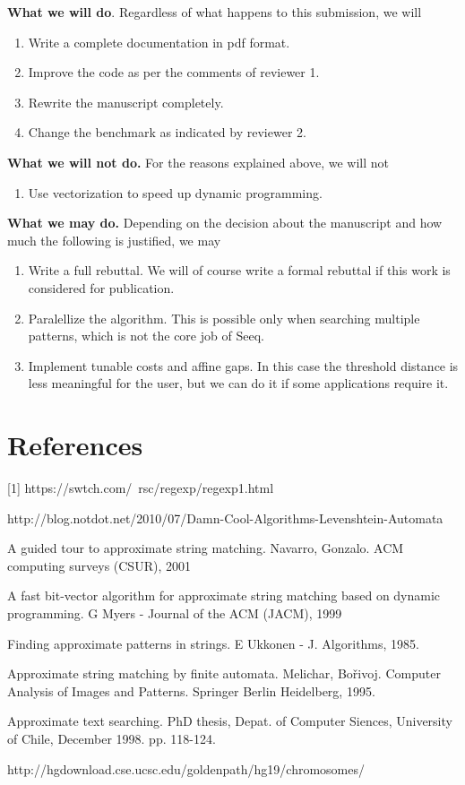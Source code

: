 \documentclass[12pt]{article}
\begin{document}
\vspace{.2in}

\noindent
\textbf{What we will do}.
\noindent
Regardless of what happens to this submission, we will
\begin{enumerate}
\item Write a complete documentation in pdf format.
\item Improve the code as per the comments of reviewer 1.
\item Rewrite the manuscript completely.
\item Change the benchmark as indicated by reviewer 2.
\end{enumerate}

\noindent
\textbf{What we will not do.}
\noindent
For the reasons explained above, we will not
\begin{enumerate}
\item Use vectorization to speed up dynamic programming.
\end{enumerate}

\noindent
\textbf{What we may do.}
\noindent
Depending on the decision about the manuscript and how
much the following is justified, we may
\begin{enumerate}
\item Write a full rebuttal. We will of course write a
formal rebuttal if this work is considered for
publication.
\item Paralellize the algorithm. This is possible only when
searching multiple patterns, which is not the core job of
Seeq.
\item Implement tunable costs and affine gaps. In this
case the threshold distance is less meaningful for the
user, but we can do it if some applications require it.
\end{enumerate}


\section{References}

[1] https://swtch.com/~rsc/regexp/regexp1.html
\par\noindent
[2] http://blog.notdot.net/2010/07/Damn-Cool-Algorithms-Levenshtein-Automata
\par\noindent
[3] A guided tour to approximate string matching. Navarro, Gonzalo.
ACM computing surveys (CSUR), 2001
\par\noindent
[4] A fast bit-vector algorithm for approximate string matching based
on dynamic programming. G Myers - Journal of the ACM (JACM), 1999
\par\noindent
[5] Finding approximate patterns in strings. E Ukkonen - J. Algorithms,
1985.
\par\noindent
[6] Approximate string matching by finite automata. Melichar, Bořivoj.
Computer Analysis of Images and Patterns. Springer Berlin Heidelberg, 1995.
\par\noindent
[7] Approximate text searching. PhD thesis, Depat. of Computer Siences,
University of Chile, December 1998. pp. 118-124.
\par\noindent
[8]http://hgdownload.cse.ucsc.edu/goldenpath/hg19/chromosomes/
\end{document}
